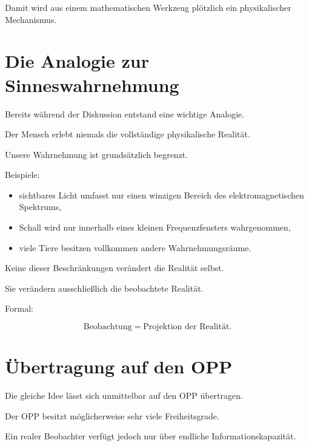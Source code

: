 Damit wird aus einem mathematischen Werkzeug plötzlich ein physikalischer Mechanismus.


\section*{Die Analogie zur Sinneswahrnehmung}

Bereits während der Diskussion entstand eine wichtige Analogie.

Der Mensch erlebt niemals die vollständige physikalische Realität.

Unsere Wahrnehmung ist grundsätzlich begrenzt.

Beispiele:

\begin{itemize}

\item

sichtbares Licht umfasst nur einen winzigen Bereich des elektromagnetischen Spektrums,

\item

Schall wird nur innerhalb eines kleinen Frequenzfensters wahrgenommen,

\item

viele Tiere besitzen vollkommen andere Wahrnehmungsräume.

\end{itemize}

Keine dieser Beschränkungen verändert die Realität selbst.

Sie verändern ausschließlich die beobachtete Realität.

Formal:

\[
\boxed{
\text{Beobachtung}
=
\text{Projektion der Realität}.
}
\]


\section*{Übertragung auf den OPP}

Die gleiche Idee lässt sich unmittelbar auf den OPP übertragen.

Der OPP besitzt möglicherweise sehr viele Freiheitsgrade.

Ein realer Beobachter verfügt jedoch nur über endliche Informationskapazität.

